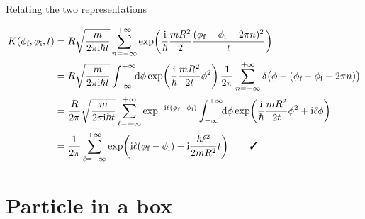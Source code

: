 \documentclass[t,dvipsnames]{beamer}
\begin{document}
\begin{frame}[c]{Relating the two representations}
 \begin{footnotesize}
  \begin{displaymath}
   \begin{aligned}
    K(\phi_\text{f}, \phi_\text{i}, t)
    &= R\sqrt{\frac{m}{2\pi\text{i}\hbar t}}
        \sum_{n=-\infty}^{+\infty}\exp\!\left(\frac{\text{i}}{\hbar}\frac{mR^2}{2}
        \frac{(\phi_\text{f}-\phi_\text{i}-2\pi n)^2}{t}\right)\\
    &= R\sqrt{\frac{m}{2\pi\text{i}\hbar t}}\int_{-\infty}^{+\infty}\!\!\text{d}\phi
       \exp\!\left(\frac{\text{i}}{\hbar}\frac{mR^2}{2t}\phi^2\right)\frac{1}{2\pi}
       \sum_{n=-\infty}^{+\infty}\delta\big(\phi-(\phi_\text{f}-\phi_\text{i}-2\pi n)\big)\\
    &= \frac{R}{2\pi}\sqrt{\frac{m}{2\pi\text{i}\hbar t}}\sum_{\ell=-\infty}^{+\infty}
 	  \exp^{-\text{i}\ell(\phi_\text{f}-\phi_\text{i})}\int_{-\infty}^{+\infty}\!\!\text{d}\phi
       \exp\!\left(\frac{\text{i}}{\hbar}\frac{mR^2}{2t}\phi^2+\text{i}\ell\phi\right)\\
    &= \frac{1}{2\pi}\sum_{\ell=-\infty}^{+\infty}\exp\!\left(\text{i}\ell(\phi_\text{f}-\phi_\text{i})
	   -\text{i}\frac{\hbar\ell^2}{2mR^2}t\right)\qquad\text{\normalsize\ding{51}}
   \end{aligned}
  \end{displaymath}
 \end{footnotesize}

 \vspace{0.4truecm}
 \begin{center}
 \end{center}
\end{frame}

\section{Particle in a box}

\begin{frame}[c]{}
 \begin{center}
  \begin{minipage}{0.8\textwidth}
   \tableofcontents[currentsection]
  \end{minipage}
 \end{center}
\end{frame}
\end{document}
